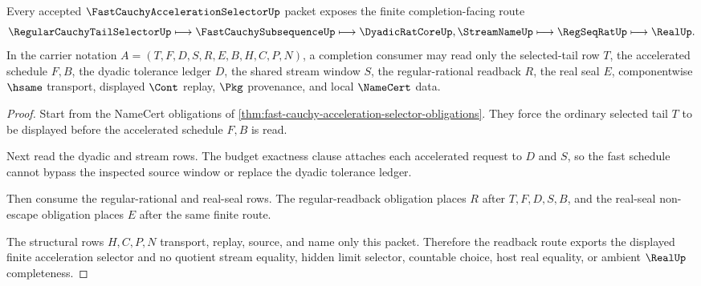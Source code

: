\begin{theorem}
\label{thm:fast-cauchy-acceleration-selector-window-readback}
Every accepted $\FastCauchyAccelerationSelectorUp$ packet exposes the finite completion-facing route
$$
\RegularCauchyTailSelectorUp
\longmapsto
\FastCauchySubsequenceUp
\longmapsto
\DyadicRatCoreUp,\StreamNameUp
\longmapsto
\RegSeqRatUp
\longmapsto
\RealUp .
$$
In the carrier notation $A=(T,F,D,S,R,E,B,H,C,P,N)$, a completion consumer may read only the selected-tail row $T$, the accelerated schedule $F,B$, the dyadic tolerance ledger $D$, the shared stream window $S$, the regular-rational readback $R$, the real seal $E$, componentwise $\hsame$ transport, displayed $\Cont$ replay, $\Pkg$ provenance, and local $\NameCert$ data.
\end{theorem}
\begin{proof}
Start from the NameCert obligations of \autoref{thm:fast-cauchy-acceleration-selector-obligations}. They force the ordinary selected tail $T$ to be displayed before the accelerated schedule $F,B$ is read.

Next read the dyadic and stream rows. The budget exactness clause attaches each accelerated request to $D$ and $S$, so the fast schedule cannot bypass the inspected source window or replace the dyadic tolerance ledger.

Then consume the regular-rational and real-seal rows. The regular-readback obligation places $R$ after $T,F,D,S,B$, and the real-seal non-escape obligation places $E$ after the same finite route.

The structural rows $H,C,P,N$ transport, replay, source, and name only this packet. Therefore the readback route exports the displayed finite acceleration selector and no quotient stream equality, hidden limit selector, countable choice, host real equality, or ambient $\RealUp$ completeness.
\end{proof}

\begin{closurestatus}{\FastCauchyAccelerationSelectorUp}
  \theoryclosure{\seedClosure}
  \formalstatus{\unformalizedV}
\end{closurestatus}
